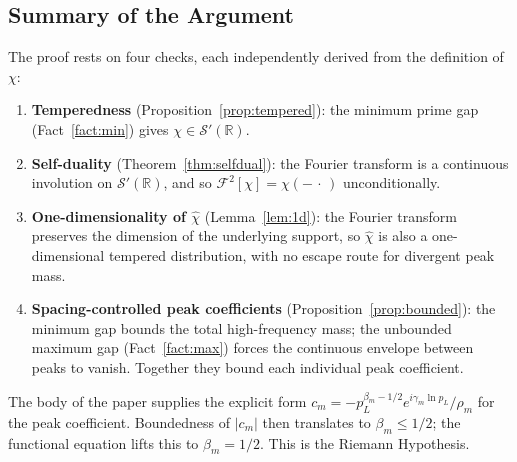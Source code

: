 \documentclass[11pt, oneside]{article}
\theoremstyle{definition}
\begin{document}
\subsection{Summary of the Argument}
\label{app:summary}

The proof rests on four checks, each independently derived
from the definition of $\chi$:
\begin{enumerate}
  \item \textbf{Temperedness} (Proposition~\ref{prop:tempered}):
        the minimum prime gap (Fact~\ref{fact:min}) gives
        $\chi \in \mathcal{S}'(\mathbb{R})$.
  \item \textbf{Self-duality}
        (Theorem~\ref{thm:selfdual}): the Fourier transform is
        a continuous involution on $\mathcal{S}'(\mathbb{R})$,
        and so $\mathcal{F}^2[\chi] = \chi(-\,\cdot\,)$
        unconditionally.
  \item \textbf{One-dimensionality of $\hat\chi$}
        (Lemma~\ref{lem:1d}): the Fourier transform preserves
        the dimension of the underlying support, so $\hat\chi$
        is also a one-dimensional tempered distribution, with
        no escape route for divergent peak mass.
  \item \textbf{Spacing-controlled peak coefficients}
        (Proposition~\ref{prop:bounded}): the minimum gap
        bounds the total high-frequency mass; the unbounded
        maximum gap (Fact~\ref{fact:max}) forces the continuous
        envelope between peaks to vanish. Together they bound
        each individual peak coefficient.
\end{enumerate}
The body of the paper supplies the explicit form
$c_m = -p_L^{\beta_m - 1/2} e^{i\gamma_m \ln p_L}/\rho_m$ for
the peak coefficient. Boundedness of $|c_m|$ then translates
to $\beta_m \le 1/2$; the functional equation lifts this
to $\beta_m = 1/2$. This is the Riemann Hypothesis.

\printbibliography
\end{document}
